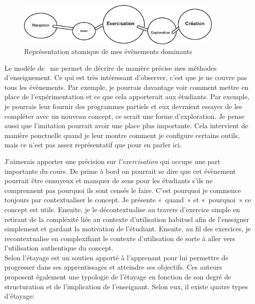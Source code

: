 \begin{figure}[H]
    \begin{center}
        \includegraphics[width=0.9\textwidth]{figures/EAEs.eps}
        \caption{Représentation atomique de mes évènements dominants~\cite{leclercq2008modele}}
    \end{center}
\end{figure}
Le modèle de~\citet{perrenoud1992differenciation} me permet de décrire de manière précise mes méthodes d'enseignement. Ce qui est très intéressant d'observer, c'est que je ne couvre pas tous les évènements. Par exemple, je pourrais davantage voir comment mettre en place de l'expérimentation et ce que cela apporterait aux étudiants. Par exemple, je pourrais leur fournir des programmes partiels et eux devraient essayer de les compléter avec un nouveau concept, ce serait une forme d’exploration. Je pense aussi que l'imitation pourrait avoir une place plus importante. Cela intervient de manière ponctuelle quand je leur montre comment je configure certains outils, mais ce n'est pas assez représentatif que pour en parler ici.

J'aimerais apporter une précision sur \emph{l’exercisation} qui occupe une part importante du cours. De prime à bord on pourrait se dire que cet évènement pourrait être ennuyeux et manquer de sens pour les étudiants s'ils ne comprennent pas pourquoi ils sont censés le faire. C'est pourquoi je commence toujours par contextualiser le concept. Je présente «~quand~» et «~pourquoi~» ce concept est utile. Ensuite, je le décontextualise au travers d'exercice simple en retirant de la complexité liée au contexte d'utilisation habituel afin de l'enseigner simplement et gardant la motivation de l’étudiant. Ensuite, au fil des exercices, je recontextualise en complexifiant le contexte d'utilisation de sorte à aller vers l’utilisation authentique du concept.\\

Selon \citet{patry2004etayage} l'étayage est un soutien apporté à l'apprenant pour lui permettre de progresser dans ses apprentissages et atteindre ses objectifs. Ces auteurs proposent également une typologie de l'étayage en fonction de son degré de structuration et de l'implication de l'enseignant. Selon eux, il existe quatre types d'étayage:

